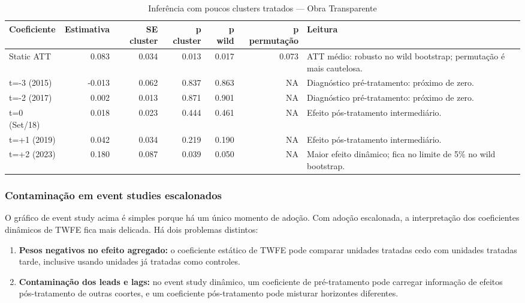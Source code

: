 \documentclass[
]{article}
\providecommand{\tightlist}{%
  \setlength{\itemsep}{0pt}\setlength{\parskip}{0pt}}
\begin{document}
\begin{table}

\caption{\label{tab:ot-wild-bootstrap}Inferência com poucos clusters tratados — Obra Transparente}
\centering
\begin{tabular}[t]{l|r|r|r|r|r|l}
\hline
Coeficiente & Estimativa & SE cluster & p cluster & p wild & p permutação & Leitura\\
\hline
Static ATT & 0.083 & 0.034 & 0.013 & 0.017 & 0.073 & ATT médio: robusto no wild bootstrap; permutação é mais cautelosa.\\
\hline
t=-3 (2015) & -0.013 & 0.062 & 0.837 & 0.863 & NA & Diagnóstico pré-tratamento: próximo de zero.\\
\hline
t=-2 (2017) & 0.002 & 0.013 & 0.871 & 0.901 & NA & Diagnóstico pré-tratamento: próximo de zero.\\
\hline
t=0 (Set/18) & 0.018 & 0.023 & 0.444 & 0.461 & NA & Efeito pós-tratamento intermediário.\\
\hline
t=+1 (2019) & 0.042 & 0.034 & 0.219 & 0.190 & NA & Efeito pós-tratamento intermediário.\\
\hline
t=+2 (2023) & 0.180 & 0.087 & 0.039 & 0.050 & NA & Maior efeito dinâmico; fica no limite de 5\% no wild bootstrap.\\
\hline
\end{tabular}
\end{table}

\subsubsection{Contaminação em event studies escalonados}\label{contaminauxe7uxe3o-em-event-studies-escalonados}

O gráfico de event study acima é simples porque há um único momento de adoção. Com adoção escalonada, a interpretação dos coeficientes dinâmicos de TWFE fica mais delicada. Há dois problemas distintos:

\begin{enumerate}
\def\labelenumi{\arabic{enumi}.}
\tightlist
\item
  \textbf{Pesos negativos no efeito agregado:} o coeficiente estático de TWFE pode comparar unidades tratadas cedo com unidades tratadas tarde, inclusive usando unidades já tratadas como controles.
\item
  \textbf{Contaminação dos leads e lags:} no event study dinâmico, um coeficiente de pré-tratamento pode carregar informação de efeitos pós-tratamento de outras coortes, e um coeficiente pós-tratamento pode misturar horizontes diferentes.
\end{enumerate}
\end{document}
